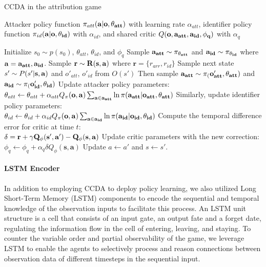 \documentclass[a4paper,11pt]{article}
\begin{document}
\begin{algorithm}
\caption{CCDA in the attribution game}
\begin{algorithmic}
\REQUIRE Attacker policy function $\pi_{att}(\bf{a}|\bf{o}, \theta_{att})$ with learning rate $\alpha_{att}$, identifier policy function $\pi_{id}(\bf{a}|\bf{o}, \theta_{id})$ with $\alpha_{id}$, and shared critic $Q(\bf{o}, \bf{a_{att}}, \bf{a_{id}}, \phi_{q})$ with $\alpha_{q}$

\STATE Initialize $s_0 \sim p(s_0)$, $\theta_{att}$, $\theta_{id}$, and $\phi_{q}$
\STATE Sample $\bf{a_{att}} \sim \pi_{\theta_{att}}$ and $\bf{a_{id}} \sim \pi_{\theta_{id}}$ where $\bf{a} = {a_{att}, a_{id}}$.
    \STATE Sample $\bf{r} \sim R(\bf{s}, \bf{a})$ where $\mathbf{r} = \{r_{arr}, r_{id}\}$
    \STATE Sample next state $s' \sim P(s'|\bf{s}, \bf{a})$ and $o'_{att}$, $o'_{id}$ from $O(s')$
    \STATE Then sample $\bf{a_{att}} \sim \pi_(\bf{o'_{att}},\theta_{att})$ and $\bf{a_{id}} \sim \pi_(\bf{o'_{id}}, \theta_{id})$
    \STATE Update attacker policy parameters:\\ $\theta_{att} \leftarrow \theta_{att} + \alpha_{att}Q_\pi(\bf{o},\mathbf{a})\sum_{a \in \mathbf{a_{att}}}\ln\pi(a_{att}|\mathbf{o_{att}}, \theta_{att})$ 
    \STATE Similarly, update identifier policy parameters: \\ $\theta_{id} \leftarrow \theta_{id} + \alpha_{id}Q_\pi(\bf{o},\mathbf{a})\sum_{a \in \mathbf{a_{id}}}\ln\pi(a_{id}|\mathbf{o_{id}}, \theta_{id})$
    \STATE Compute the temporal difference error for critic at time $t$:\\ $\delta = \bf{r} + \gamma Q_\phi(\mathbf{s'}, \mathbf{a'}) - Q_\phi(\mathbf{s}, \mathbf{a})$
    \STATE Update critic parameters with the new correction:\\
    $\phi_{q} \leftarrow \phi_{q} + \alpha_{q}\delta Q_\phi(\mathbf{s}, \mathbf{a})$
    \STATE Update $a \leftarrow a'$ and $s \leftarrow s'$.
\ENDWHILE
\end{algorithmic}
\end{algorithm}
\paragraph{LSTM Encoder} \cite{lstm-Hochreiter} \cite{chu2019multiagent} \cite{sukhbaatar2016learning}
In addition to employing CCDA to deploy policy learning, we also utilized Long Short-Term Memory (LSTM) components to encode the sequential and temporal knowledge of the observation inputs to facilitate this process. An LSTM unit structure is a cell that consists of an input gate, an output fate and a forget date, regulating the information flow in the cell of entering, leaving, and staying. To counter the variable order and partial observability of the game, we leverage LSTM to enable the agents to selectively process and reason connections between observation data of different timesteps in the sequential input. 
\end{document}
